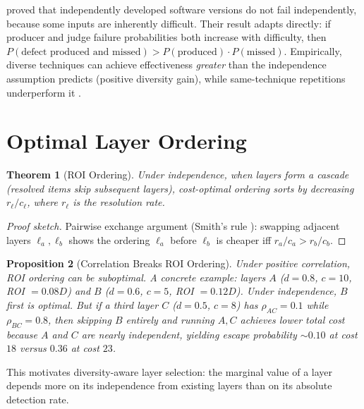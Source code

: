 \documentclass[11pt, a4paper]{article}
\newtheorem{theorem}{Theorem}[section]
\newtheorem{proposition}[theorem]{Proposition}
\theoremstyle{definition}
\theoremstyle{remark}
\begin{document}
\citet{littlewood1993, littlewood2000} proved that independently developed software versions do not fail independently, because some inputs are inherently difficult. Their result adapts directly: if producer and judge failure probabilities both increase with difficulty, then $P(\text{defect produced and missed}) > P(\text{produced}) \cdot P(\text{missed})$. Empirically, diverse techniques can achieve effectiveness \emph{greater} than the independence assumption predicts (positive diversity gain), while same-technique repetitions underperform it \citep{littlewood2000}.


\section{Optimal Layer Ordering}
\label{sec:ordering}

\begin{theorem}[ROI Ordering]
\label{thm:ordering}
Under independence, when layers form a cascade (resolved items skip subsequent layers), cost-optimal ordering sorts by decreasing $r_\ell / c_\ell$, where $r_\ell$ is the resolution rate.
\end{theorem}

\begin{proof}[Proof sketch]
Pairwise exchange argument (Smith's rule \citep{smith1956}): swapping adjacent layers $\ell_a, \ell_b$ shows the ordering $\ell_a$ before $\ell_b$ is cheaper iff $r_a / c_a > r_b / c_b$.
\end{proof}

\begin{proposition}[Correlation Breaks ROI Ordering]
\label{prop:corrbreaks}
Under positive correlation, ROI ordering can be suboptimal. A concrete example: layers $A$ ($d=0.8$, $c=10$, ROI $= 0.08D$) and $B$ ($d=0.6$, $c=5$, ROI $= 0.12D$). Under independence, $B$ first is optimal. But if a third layer $C$ ($d=0.5$, $c=8$) has $\rho_{AC} = 0.1$ while $\rho_{BC} = 0.8$, then skipping $B$ entirely and running $A, C$ achieves lower total cost because $A$ and $C$ are nearly independent, yielding escape probability ${\sim}0.10$ at cost $18$ versus $0.36$ at cost $23$.
\end{proposition}

This motivates diversity-aware layer selection: the marginal value of a layer depends more on its independence from existing layers than on its absolute detection rate.
\end{document}
